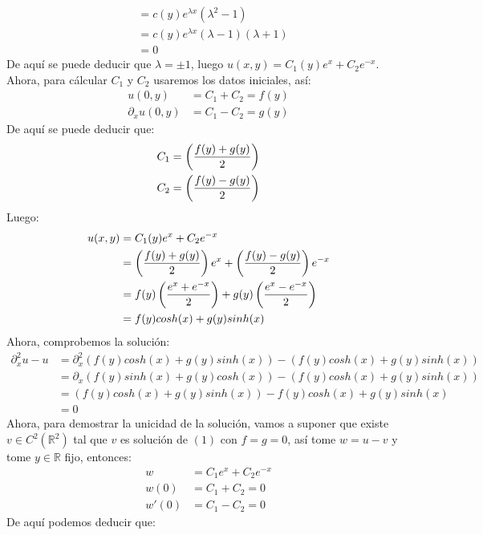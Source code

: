 \begin{homeworkProblem}
\begin{enumerate}[i)]
\begin{solucion}
\begin{align*}
            &=c(y)e^{\lambda x}(\lambda^2-1)\\
            &=c(y)e^{\lambda x}(\lambda-1)(\lambda + 1)\\
            &=0
        \end{align*}
        De aquí se puede deducir que $\lambda=\pm 1$, luego $u(x,y)=C_1(y)e^{x}+C_2e^{-x}$.\\
        Ahora, para cálcular $C_1$ y $C_2$ usaremos los datos iniciales, así:
        \begin{align*}
            u(0,y)&=C_1+C_2=f(y)\\
            \partial_{x}u(0,y)&=C_1-C_2=g(y)
        \end{align*}
        De aquí se puede deducir que:
        \begin{align*}
            C_1=\left( \frac{f(y)+g(y)}{2} \right)\\
            C_2=\left( \frac{f(y)-g(y)}{2} \right)
        \end{align*}
        Luego:
        \begin{align*}
            u(x,y)&=C_1(y)e^{x}+C_2e^{-x}\\
            &=\left( \frac{f(y)+g(y)}{2} \right)e^{x}+\left( \frac{f(y)-g(y)}{2} \right)e^{-x}\\
            &=f(y)\left( \frac{e^{x}+e^{-x}}{2} \right)+g(y)\left( \frac{e^{x}-e^{-x}}{2} \right)\\
            &=f(y)cosh(x)+g(y)sinh(x)
        \end{align*}
        Ahora, comprobemos la solución:
        \begin{align*}
            \partial_{x}^2u-u&=\partial_{x}^2(f(y)cosh(x)+g(y)sinh(x))-(f(y)cosh(x)+g(y)sinh(x))\\
            &=\partial_{x}(f(y)sinh(x)+g(y)cosh(x))-(f(y)cosh(x)+g(y)sinh(x))\\
            &=(f(y)cosh(x)+g(y)sinh(x))-f(y)cosh(x)+g(y)sinh(x)\\
            &=0
        \end{align*}
        Ahora, para demostrar la unicidad de la solución, vamos a suponer que existe $v\in C^{2}(\mathbb{R}^2)$ tal que $v$ es solución de $(1)$ con $f=g=0$, así tome $w=u-v$ y tome $y\in \mathbb{R}$ fijo, entonces:
        \begin{align*}
            w&=C_1e^{x}+C_2e^{-x}\\
            w(0)&=C_1+C_2=0\\
            w'(0)&=C_1-C_2=0
        \end{align*}
        De aquí podemos deducir que:

\end{solucion}
\end{enumerate}
\end{homeworkProblem}
